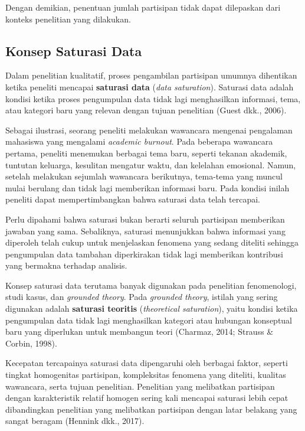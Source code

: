 \documentclass[
  indonesian,
  letterpaper,
  DIV=11,
  numbers=noendperiod]{scrreprt}
\begin{document}
Dengan demikian, penentuan jumlah partisipan tidak dapat dilepaskan dari
konteks penelitian yang dilakukan.

\subsection{Konsep Saturasi Data}\label{konsep-saturasi-data}

Dalam penelitian kualitatif, proses pengambilan partisipan umumnya
dihentikan ketika peneliti mencapai \textbf{saturasi data} (\emph{data
saturation}). Saturasi data adalah kondisi ketika proses pengumpulan
data tidak lagi menghasilkan informasi, tema, atau kategori baru yang
relevan dengan tujuan penelitian (Guest dkk., 2006).

Sebagai ilustrasi, seorang peneliti melakukan wawancara mengenai
pengalaman mahasiswa yang mengalami \emph{academic burnout}. Pada
beberapa wawancara pertama, peneliti menemukan berbagai tema baru,
seperti tekanan akademik, tuntutan keluarga, kesulitan mengatur waktu,
dan kelelahan emosional. Namun, setelah melakukan sejumlah wawancara
berikutnya, tema-tema yang muncul mulai berulang dan tidak lagi
memberikan informasi baru. Pada kondisi inilah peneliti dapat
mempertimbangkan bahwa saturasi data telah tercapai.

Perlu dipahami bahwa saturasi bukan berarti seluruh partisipan
memberikan jawaban yang sama. Sebaliknya, saturasi menunjukkan bahwa
informasi yang diperoleh telah cukup untuk menjelaskan fenomena yang
sedang diteliti sehingga pengumpulan data tambahan diperkirakan tidak
lagi memberikan kontribusi yang bermakna terhadap analisis.

Konsep saturasi data terutama banyak digunakan pada penelitian
fenomenologi, studi kasus, dan \emph{grounded theory}. Pada
\emph{grounded theory}, istilah yang sering digunakan adalah
\textbf{saturasi teoritis} (\emph{theoretical saturation}), yaitu
kondisi ketika pengumpulan data tidak lagi menghasilkan kategori atau
hubungan konseptual baru yang diperlukan untuk membangun teori (Charmaz,
2014; Strauss \& Corbin, 1998).

Kecepatan tercapainya saturasi data dipengaruhi oleh berbagai faktor,
seperti tingkat homogenitas partisipan, kompleksitas fenomena yang
diteliti, kualitas wawancara, serta tujuan penelitian. Penelitian yang
melibatkan partisipan dengan karakteristik relatif homogen sering kali
mencapai saturasi lebih cepat dibandingkan penelitian yang melibatkan
partisipan dengan latar belakang yang sangat beragam (Hennink dkk.,
2017).
\end{document}
